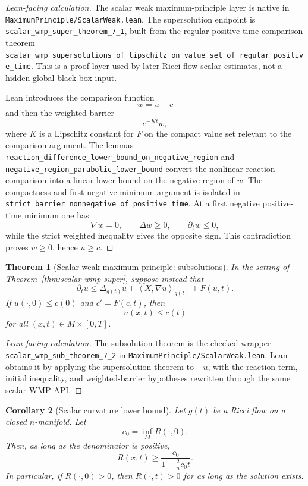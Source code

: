 \documentclass[11pt]{article}
\theoremstyle{plain}
\newtheorem{theorem}{Theorem}[section]
\newtheorem{corollary}[theorem]{Corollary}
\theoremstyle{definition}
\theoremstyle{remark}
\newcommand{\ip}[2]{\left\langle #1,#2\right\rangle}
\newcommand{\leanref}[1]{\nolinkurl{#1}}
\newcommand{\leanfile}[1]{\nolinkurl{#1}}
\newcommand{\rffile}[1]{\leanfile{#1}}
\begin{document}
\begin{proof}[Lean-facing calculation]
The scalar weak maximum-principle layer is native in
\rffile{MaximumPrinciple/ScalarWeak.lean}.  The supersolution endpoint is
\leanref{scalar_wmp_super_theorem_7_1}, built from the regular positive-time
comparison theorem
\leanref{scalar_wmp_supersolutions_of_lipschitz_on_value_set_of_regular_positive_time}.
This is a proof layer used by later Ricci-flow scalar estimates, not a hidden
global black-box input.

Lean introduces the comparison function
\[
  w=u-c
\]
and then the weighted barrier
\[
  e^{-Kt}w,
\]
where $K$ is a Lipschitz constant for $F$ on the compact value set relevant to
the comparison argument.  The lemmas
\leanref{reaction_difference_lower_bound_on_negative_region} and
\leanref{negative_region_parabolic_lower_bound} convert the nonlinear reaction
comparison into a linear lower bound on the negative region of $w$.  The
compactness and first-negative-minimum argument is isolated in
\leanref{strict_barrier_nonnegative_of_positive_time}.  At a first negative
positive-time minimum one has
\[
  \nabla w=0,
  \qquad
  \Delta w\ge0,
  \qquad
  \partial_tw\le0,
\]
while the strict weighted inequality gives the opposite sign.  This
contradiction proves $w\ge0$, hence $u\ge c$.
\end{proof}

\begin{theorem}[Scalar weak maximum principle: subsolutions]
\label{thm:scalar-wmp-sub}
In the setting of Theorem~\ref{thm:scalar-wmp-super}, suppose instead that
\[
\partial_tu
\le
\Delta_{g(t)}u+
\ip{X}{\nabla u}_{g(t)}+F(u,t).
\]
If $u(\cdot,0)\le c(0)$ and $c'=F(c,t)$, then
\[
u(x,t)\le c(t)
\]
for all $(x,t)\in M\times[0,T]$.
\end{theorem}

\begin{proof}[Lean-facing calculation]
The subsolution theorem is the checked wrapper
\leanref{scalar_wmp_sub_theorem_7_2} in
\rffile{MaximumPrinciple/ScalarWeak.lean}.  Lean obtains it by applying the
supersolution theorem to $-u$, with the reaction term, initial inequality, and
weighted-barrier hypotheses rewritten through the same scalar WMP API.
\end{proof}

\begin{corollary}[Scalar curvature lower bound]
\label{cor:scalar-lower-bound}
Let $g(t)$ be a Ricci flow on a closed $n$-manifold. Let
\[
c_0=\inf_MR(\cdot,0).
\]
Then, as long as the denominator is positive,
\[
R(x,t)
\ge
\frac{c_0}{1-\frac2n c_0t}.
\]
In particular, if $R(\cdot,0)>0$, then $R(\cdot,t)>0$ for as long as the
solution exists.
\end{corollary}
\end{document}
